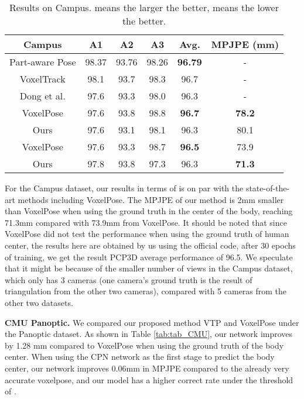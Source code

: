 \documentclass[lettersize,journal]{IEEEtran}
\begin{document}
\begin{table}[!htbp]
\centering
\caption{Results on Campus.  means the larger the better,  means the lower the better.}
\resizebox{\linewidth}{!} {
\begin{tabular}{cccccc}
\hline
Campus & A1  & A2  & A3  & Avg.  & MPJPE (mm) \\
\hline
 Part-aware Pose  \cite{chu2021part} & 98.37 & 93.76 & 98.26 & \textbf{96.79} & -\\
 VoxelTrack \cite{zhang2021voxeltrack} & 98.1 & 93.7 & 98.3 & 96.7 & -\\
\hline
Dong et al. \cite{dong2019fast} &  97.6 & 93.3 & 98.0 & 96.3 & - \\
VoxelPose \cite{tu2020voxelpose} & 97.6 & 93.8 & 98.8 & \textbf{96.7} & \textbf{78.2}\\
Ours & 97.6 & 93.1 & 98.1 & 96.3 & 80.1\\

\hline
 VoxelPose \cite{tu2020voxelpose}  & 97.6 & 93.3 & 98.7 & \textbf{96.5}  & 73.9 \\
 Ours  & 97.8 & 93.8 & 97.3 & 96.3 & \textbf{71.3} \\
\hline
\end{tabular}
}
\label{tab:tab_campus}
\end{table}

\par For the Campus dataset, our results in terms of  is on par with the state-of-the-art methods including VoxelPose. The MPJPE of our method is 2mm smaller than VoxelPose when using the ground truth in the center of the body, reaching 71.3mm compared with 73.9mm from VoxelPose. It should be noted that since VoxelPose did not test the performance when using the ground truth of human center, the results here are obtained by us using the official code, after 30 epochs of training, we get the result PCP3D average performance of 96.5. We speculate that it might be because of the smaller number of views in the Campus dataset, which only has 3 cameras (one camera's ground truth is the result of triangulation from the other two cameras), compared with 5 cameras from the other two datasets.




\par \textbf{CMU Panoptic.} We compared our proposed method VTP and VoxelPose under the Panoptic dataset. As shown in Table \ref{tab:tab_CMU}, our network improves by 1.28 mm compared to VoxelPose when using the ground truth of the body center. When using the CPN network as the first stage to predict the body center, our network improves 0.06mm in MPJPE compared to the already very accurate voxelpose, and our model has a higher correct rate under the threshold of .
\end{document}
